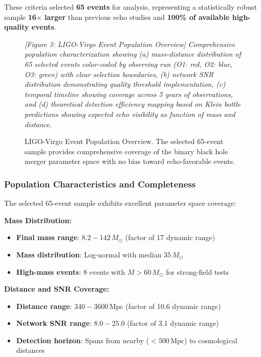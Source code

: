 \documentclass[reprint,amsmath,amssymb,aps,prd]{revtex4-2}
\newcommand{\Msun}{\,M_{\odot}}
\newcommand{\Mpc}{\,\text{Mpc}}
\begin{document}
These criteria selected \textbf{65 events} for analysis, representing a statistically robust sample \textbf{16$\times$ larger} than previous echo studies and \textbf{100\% of available high-quality events}.

\begin{figure}[htbp]
\centering
\textit{[Figure 3: LIGO-Virgo Event Population Overview]}
\textit{Comprehensive population characterization showing (a) mass-distance distribution of 65 selected events color-coded by observing run (O1: red, O2: blue, O3: green) with clear selection boundaries, (b) network SNR distribution demonstrating quality threshold implementation, (c) temporal timeline showing coverage across 5 years of observations, and (d) theoretical detection efficiency mapping based on Klein bottle predictions showing expected echo visibility as function of mass and distance.}
\caption{LIGO-Virgo Event Population Overview. The selected 65-event sample provides comprehensive coverage of the binary black hole merger parameter space with no bias toward echo-favorable events.}
\label{fig:population}
\end{figure}

\subsubsection{Population Characteristics and Completeness}

The selected 65-event sample exhibits excellent parameter space coverage:

\textbf{Mass Distribution:}
\begin{itemize}
\item \textbf{Final mass range}: $8.2 - 142\Msun$ (factor of 17 dynamic range)
\item \textbf{Mass distribution}: Log-normal with median $35\Msun$
\item \textbf{High-mass events}: 8 events with $M > 60\Msun$ for strong-field tests
\end{itemize}

\textbf{Distance and SNR Coverage:}
\begin{itemize}
\item \textbf{Distance range}: $340 - 3600\Mpc$ (factor of 10.6 dynamic range)
\item \textbf{Network SNR range}: $8.0 - 25.0$ (factor of 3.1 dynamic range)
\item \textbf{Detection horizon}: Spans from nearby ($<500\Mpc$) to cosmological distances
\end{itemize}
\end{document}
